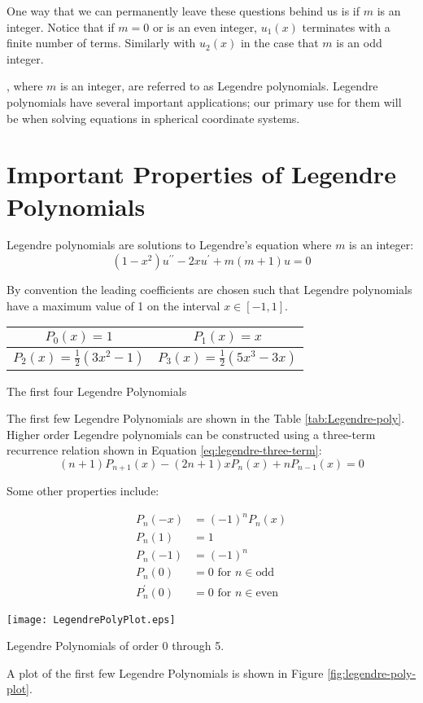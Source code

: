 One way that we can permanently leave these questions behind us is if $m$ is an integer.  Notice that if $m=0$ or is an even integer, $u_1(x)$ terminates with a finite number of terms. Similarly with $u_2(x)$ in the case that $m$ is an odd integer. 

, where $m$ is an integer, are referred to as Legendre polynomials.  Legendre polynomials have several important applications; our primary use for them will be when solving equations in spherical coordinate systems.

\section{Important Properties of Legendre Polynomials}
Legendre polynomials are solutions to Legendre's equation where $m$ is an integer:
\begin{equation*}
\left(1-x^2 \right)u^{\prime \prime} - 2xu^{\prime} + m(m+1)u = 0
\end{equation*}

By convention the leading coefficients are chosen such that Legendre polynomials have a maximum value of 1 on the interval $x\in[-1,1]$.  

\begin{margintable}
\begin{tabular}{c | c}
$P_0(x) = 1$ & $P_1(x) = x$ \\\hline
$P_2(x) = \frac{1}{2}(3x^2-1)$ & $P_3(x) = \frac{1}{2}(5x^3-3x)$ \\
\end{tabular}
\caption{The first four Legendre Polynomials}
\label{tab:Legendre-poly}
\end{margintable}
The first few Legendre Polynomials are shown in the Table \ref{tab:Legendre-poly}. Higher order Legendre polynomials can be constructed using a three-term recurrence relation shown in Equation \ref{eq:legendre-three-term}:
\begin{equation}
(n+1)P_{n+1}(x) - (2n+1)xP_n(x) + nP_{n-1}(x) = 0
\label{eq:legendre-three-term}
\end{equation}

\vspace{4.0cm}

Some other properties include:

\begin{align*}
P_n(-x) &= (-1)^nP_n(x) \\
P_n(1) &= 1 \\
P_n(-1) &= (-1)^n \\
P_n(0) &= 0 \text{ for } n\in{\text{odd}} \\
P_n^{\prime}(0) &=0 \text{ for } n\in{\text{even}}
\end{align*}
\begin{marginfigure}
\texttt{[image: LegendrePolyPlot.eps]}
\caption{Legendre Polynomials of order 0 through 5.}
\label{fig:legendre-poly-plot}
\end{marginfigure}
A plot of the first few Legendre Polynomials is shown in Figure \ref{fig:legendre-poly-plot}.


